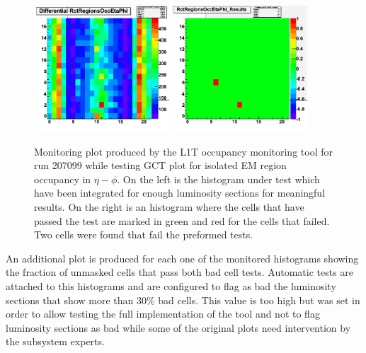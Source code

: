 \begin{figure}[!htb]
\centering
\includegraphics[width=0.45\textwidth]{Chapter03/L1TOnline/Images/L1TOccupancy_Diff.png}
\includegraphics[width=0.45\textwidth]{Chapter03/L1TOnline/Images/L1TOccupancy_Results.png}
\caption{Monitoring plot produced by the \gls{L1T} occupancy monitoring tool for run 207099 while testing \gls{GCT} plot for isolated \gls{EM} region occupancy in $\eta-\phi$. On the left is the histogram under test which have been integrated for enough luminosity sections for meaningful results. On the right is an histogram where the cells that have passed the test are marked in green and red for the cells that failed. Two cells were found that fail the preformed tests.}
\label{FIGURE:TechnicalWork_L1TOccupancyTests}
\end{figure}

An additional plot is produced for each one of the monitored histograms showing the fraction of unmasked cells that pass both bad cell tests. Automatic tests are attached to this histograms and are configured to flag as bad the luminosity sections that show more than 30\% bad cells. This value is too high but was set in order to allow testing the full implementation of the tool and not to flag luminosity sections as bad while some of the original plots need intervention by the subsystem experts.

